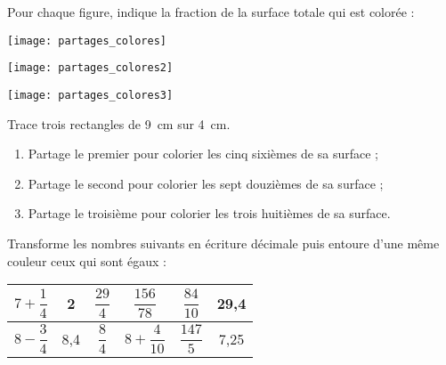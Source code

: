 \begin{exercice}
Pour chaque figure, indique la fraction de la surface totale qui est colorée :
\begin{colenumerate}{3}
 \item 
 
 \texttt{[image: partages\_colores]}
 \item
  
 \texttt{[image: partages\_colores2]}
 \item
  
 \texttt{[image: partages\_colores3]}
 \end{colenumerate}
\end{exercice}


\begin{exercice}[Coloriage]
Trace trois rectangles de 9 cm sur 4 cm.
\begin{enumerate}
 \item Partage le premier pour colorier les cinq sixièmes de sa surface ;
 \item Partage le second pour colorier les sept douzièmes de sa surface ;
 \item Partage le troisième pour colorier les trois huitièmes de sa surface.
 \end{enumerate}
\end{exercice}


\begin{exercice}
Transforme les nombres suivants en écriture décimale puis entoure d’une même couleur ceux qui sont égaux :
\begin{center}
  \begin{tabular}{|c|c|c|c|c|c|} %
  \hline
  \rowcolor{F2} $7 + \dfrac{1}{4}$ & 2 & $\dfrac{29}{4}$ & $\dfrac{156}{78}$ & $\dfrac{84}{10}$ & 29,4 \\\hline
  \rowcolor{F2} $8 - \dfrac{3}{4}$ & 8,4 & $\dfrac{8}{4}$ & $8 + \dfrac{4}{10}$ & $\dfrac{147}{5}$ & 7,25 \\\hline
  \end{tabular}
 \end{center}
\end{exercice}


